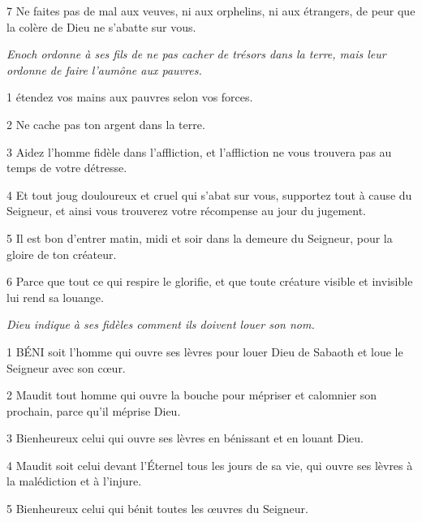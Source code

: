 \par 7 Ne faites pas de mal aux veuves, ni aux orphelins, ni aux étrangers, de peur que la colère de Dieu ne s'abatte sur vous.


\par \textit{Enoch ordonne à ses fils de ne pas cacher de trésors dans la terre, mais leur ordonne de faire l'aumône aux pauvres.}

\par 1 étendez vos mains aux pauvres selon vos forces.

\par 2 Ne cache pas ton argent dans la terre.

\par 3 Aidez l'homme fidèle dans l'affliction, et l'affliction ne vous trouvera pas au temps de votre détresse.

\par 4 Et tout joug douloureux et cruel qui s'abat sur vous, supportez tout à cause du Seigneur, et ainsi vous trouverez votre récompense au jour du jugement.

\par 5 Il est bon d'entrer matin, midi et soir dans la demeure du Seigneur, pour la gloire de ton créateur.

\par 6 Parce que tout ce qui respire le glorifie, et que toute créature visible et invisible lui rend sa louange.


\par \textit{Dieu indique à ses fidèles comment ils doivent louer son nom.}

\par 1 BÉNI soit l'homme qui ouvre ses lèvres pour louer Dieu de Sabaoth et loue le Seigneur avec son cœur.

\par 2 Maudit tout homme qui ouvre la bouche pour mépriser et calomnier son prochain, parce qu'il méprise Dieu.

\par 3 Bienheureux celui qui ouvre ses lèvres en bénissant et en louant Dieu.

\par 4 Maudit soit celui devant l'Éternel tous les jours de sa vie, qui ouvre ses lèvres à la malédiction et à l'injure.

\par 5 Bienheureux celui qui bénit toutes les œuvres du Seigneur.

